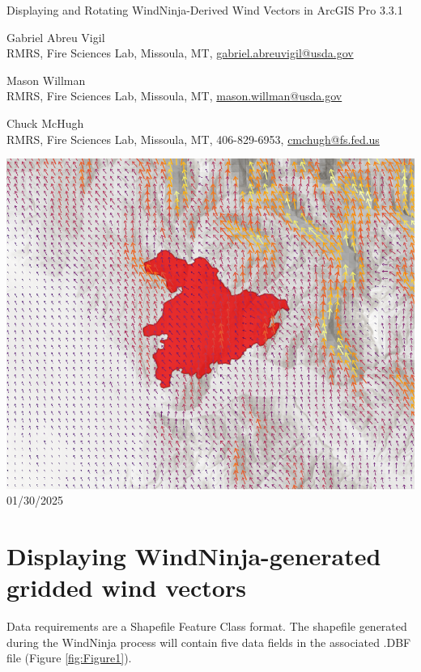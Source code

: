 \documentclass[12pt]{article}
\begin{document}
\begin{titlepage}
    \centering
    {\Huge
        Displaying and Rotating WindNinja-Derived Wind Vectors in ArcGIS Pro 3.3.1
    }
    \vfill
    {\Large
    Gabriel Abreu Vigil\\ RMRS, Fire Sciences Lab, Missoula, MT, \href{mailto:gabriel.abreuvigil@usda.gov}{gabriel.abreuvigil@usda.gov}

    Mason Willman\\ RMRS, Fire Sciences Lab, Missoula, MT, \href{mailto:mason.willman@usda.gov}{mason.willman@usda.gov}

    Chuck McHugh\\ RMRS, Fire Sciences Lab, Missoula, MT, 406-829-6953, \href{mailto:cmchugh@fs.fed.us}{cmchugh@fs.fed.us}
    }
    \vfill
    \includegraphics[scale=0.45]							{arc_00.png}
    \vfill
  	{\Large
	  01/30/2025 %
  	}
    \vfill
\end{titlepage}

\section*{Displaying WindNinja-generated gridded wind vectors}
Data requirements are a Shapefile Feature Class format. The shapefile generated during the WindNinja process will
contain five data fields in the associated .DBF file (Figure \ref{fig:Figure1}).
\end{document}
